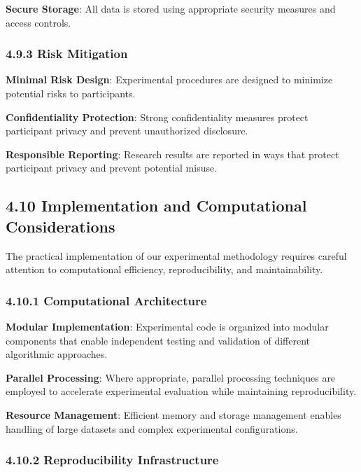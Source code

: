 \documentclass[
  11pt,
  a4paper,
]{article}
\begin{document}
\textbf{Secure Storage}: All data is stored using appropriate security
measures and access controls.

\subsubsection{4.9.3 Risk Mitigation}\label{risk-mitigation}

\textbf{Minimal Risk Design}: Experimental procedures are designed to
minimize potential risks to participants.

\textbf{Confidentiality Protection}: Strong confidentiality measures
protect participant privacy and prevent unauthorized disclosure.

\textbf{Responsible Reporting}: Research results are reported in ways
that protect participant privacy and prevent potential misuse.

\subsection{4.10 Implementation and Computational
Considerations}\label{implementation-and-computational-considerations}

The practical implementation of our experimental methodology requires
careful attention to computational efficiency, reproducibility, and
maintainability.

\subsubsection{4.10.1 Computational
Architecture}\label{computational-architecture}

\textbf{Modular Implementation}: Experimental code is organized into
modular components that enable independent testing and validation of
different algorithmic approaches.

\textbf{Parallel Processing}: Where appropriate, parallel processing
techniques are employed to accelerate experimental evaluation while
maintaining reproducibility.

\textbf{Resource Management}: Efficient memory and storage management
enables handling of large datasets and complex experimental
configurations.

\subsubsection{4.10.2 Reproducibility
Infrastructure}\label{reproducibility-infrastructure}
\end{document}
